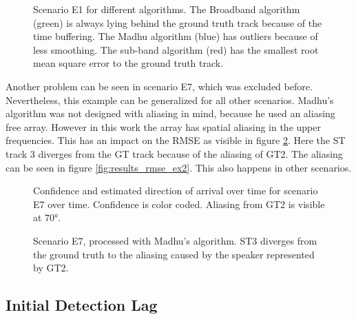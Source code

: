 \begin{figure}[!ht]
	\centering
		\def\svgwidth{1\linewidth}
		  \small
		\caption{Scenario E1 for different algorithms. The Broadband algorithm (green) is always lying behind the ground truth track because of the time buffering. The Madhu algorithm (blue) has outliers because of less smoothing. The sub-band algorithm (red) has the smallest root mean square error to the ground truth track. }
		\label{fig:results_rmse_ex1}
\end{figure}

Another problem can be seen in scenario E7, which was excluded before. Nevertheless, this example can be generalized for all other scenarios. Madhu's algorithm was not designed with aliasing in mind, because he used an aliasing free array. However in this work the array has spatial aliasing in the upper frequencies. This has an impact on the RMSE as visible in figure \ref{fig:results_rmse_ex3}. Here the \ac{ST} track 3 diverges from the \ac{GT} track because of the aliasing of GT2. The aliasing can be seen in figure \ref{fig:results_rmse_ex2}. This also happens in other scenarios.

\begin{figure}[!ht]
	\centering
	\begin{minipage}[t]{.49\textwidth}
		\def\svgwidth{1\linewidth}
		  \scriptsize
		\caption{Confidence and estimated direction of arrival over time for scenario E7 over time. Confidence is
		color coded. Aliasing from GT2 is visible at $\ang{70}$.}
		\label{fig:results_rmse_ex2}
	\end{minipage}%
	\hfill
	\begin{minipage}[t]{.49\textwidth}
		\centering
		\def\svgwidth{1\linewidth}
		\scriptsize
		\caption{Scenario E7, processed with Madhu's algorithm. ST3 diverges from the ground truth to the aliasing caused by the speaker represented by GT2.}
		\label{fig:results_rmse_ex3}
	\end{minipage}
\end{figure}
\subsection{Initial Detection Lag}

